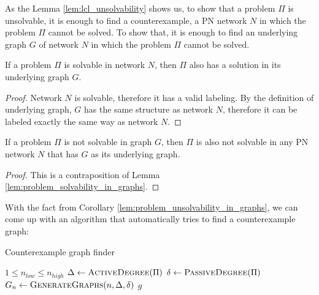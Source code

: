 As the Lemma \ref{lem:lcl_unsolvability} shows us, to show that a problem $\Pi$ is unsolvable, it is enough to find a counterexample, a PN network $N$ in which the problem $\Pi$ cannot be solved.
To show that, it is enough to find an underlying graph $G$ of network $N$ in which the problem $\Pi$ cannot be solved.

\begin{lemma} \label{lem:problem_solvability_in_graphs}
    If a problem $\Pi$ is solvable in network $N$, then $\Pi$ also has a solution in its underlying graph $G$.
\end{lemma}
\begin{proof}
    Network $N$ is solvable, therefore it has a valid labeling.
    By the definition of underlying graph, $G$ has the same structure as network $N$, therefore it can be labeled exactly the same way as network $N$.
\end{proof}
\begin{corollary} \label{lem:problem_unsolvability_in_graphs}
    If a problem $\Pi$ is not solvable in graph $G$, then $\Pi$ is also not solvable in any PN network $N$ that has $G$ as its underlying graph.
\end{corollary}
\begin{proof}
This is a contraposition of Lemma \ref{lem:problem_solvability_in_graphs}.
\end{proof}

With the fact from Corollary \ref{lem:problem_unsolvability_in_graphs}, we can come up with an algorithm that automatically tries to find a counterexample graph:

\begin{algorithm}[H]
    \caption{Counterexample graph finder}
    \label{alg:counterexample_finder}
    \begin{algorithmic}[1] %
        \Require $1 \leq n_{low} \leq n_{high}$
          \label{alg:counterexample_finder:n_loop}
            \State $\Delta \gets \textsc{ActiveDegree}(\Pi)$ \label{alg:counterexample_finder:d_a}
            \State $\delta \gets \textsc{PassiveDegree}(\Pi)$ \label{alg:counterexample_finder:d_p}
              \label{alg:counterexample_finder:n}
                \State $G_n \gets \textsc{GenerateGraphs}(n, \Delta, \delta)$ \label{alg:counterexample_finder:Gn}
                 \label{alg:counterexample_finder:g}
                     \label{alg:counterexample_finder:solution_exists}
                        \State \Return $g$ \label{alg:counterexample_finder:return_g}
                    \EndIf
                \EndFor
            \EndFor
            \State \Return {} \label{alg:counterexample_finder:return_nothing}
        \EndFunction
    \end{algorithmic}
\end{algorithm}

